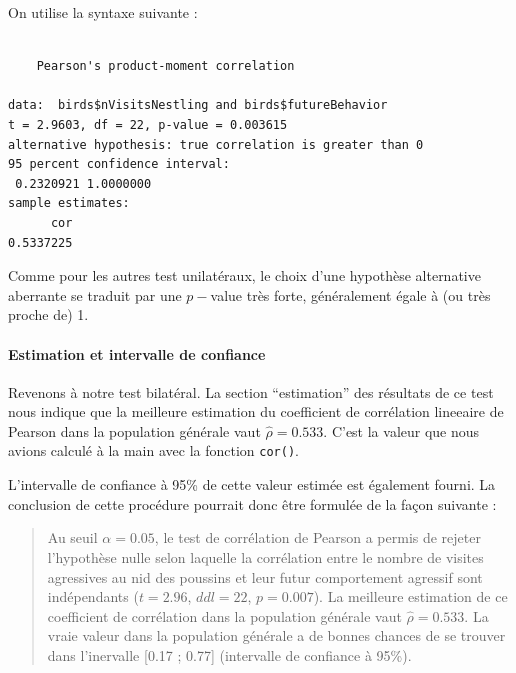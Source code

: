 \documentclass[a4paperpaper,]{article}
\newenvironment{Shaded}{\begin{snugshade}}{\end{snugshade}}
\newcommand{\DataTypeTok}[1]{\textcolor[rgb]{0.00,0.34,0.68}{#1}}
\newcommand{\KeywordTok}[1]{\textcolor[rgb]{0.12,0.11,0.11}{\textbf{#1}}}
\newcommand{\NormalTok}[1]{\textcolor[rgb]{0.12,0.11,0.11}{#1}}
\newcommand{\OperatorTok}[1]{\textcolor[rgb]{0.12,0.11,0.11}{#1}}
\newcommand{\StringTok}[1]{\textcolor[rgb]{0.75,0.01,0.01}{#1}}
\let\oldparagraph\paragraph
\renewcommand{\paragraph}[1]{\oldparagraph{#1}\mbox{}}
\begin{document}
On utilise la syntaxe suivante :

\begin{Shaded}
\end{Shaded}

\begin{verbatim}

    Pearson's product-moment correlation

data:  birds$nVisitsNestling and birds$futureBehavior
t = 2.9603, df = 22, p-value = 0.003615
alternative hypothesis: true correlation is greater than 0
95 percent confidence interval:
 0.2320921 1.0000000
sample estimates:
      cor 
0.5337225 
\end{verbatim}

Comme pour les autres test unilatéraux, le choix d'une hypothèse alternative aberrante se traduit par une \(p-\)value très forte, généralement égale à (ou très proche de) 1.

\hypertarget{estimation-et-intervalle-de-confiance}{%
\paragraph{Estimation et intervalle de confiance}\label{estimation-et-intervalle-de-confiance}}

Revenons à notre test bilatéral. La section ``estimation'' des résultats de ce test nous indique que la meilleure estimation du coefficient de corrélation lineeaire de Pearson dans la population générale vaut \(\hat{\rho} = 0.533\). C'est la valeur que nous avions calculé à la main avec la fonction \texttt{cor()}.

L'intervalle de confiance à 95\% de cette valeur estimée est également fourni. La conclusion de cette procédure pourrait donc être formulée de la façon suivante :

\begin{quote}
Au seuil \(\alpha = 0.05\), le test de corrélation de Pearson a permis de rejeter l'hypothèse nulle selon laquelle la corrélation entre le nombre de visites agressives au nid des poussins et leur futur comportement agressif sont indépendants (\(t = 2.96\), \(ddl = 22\), \(p = 0.007\)). La meilleure estimation de ce coefficient de corrélation dans la population générale vaut \(\hat{\rho} = 0.533\). La vraie valeur dans la population générale a de bonnes chances de se trouver dans l'inervalle {[}0.17 ; 0.77{]} (intervalle de confiance à 95\%).
\end{quote}
\end{document}
